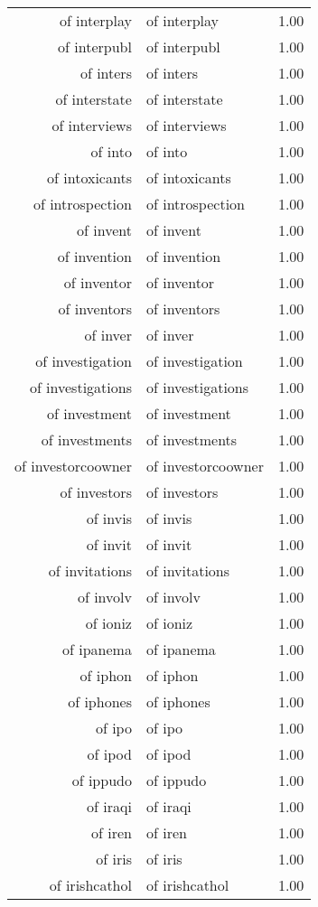 \begin{table}[ht]
\begin{tabular}{rlr}
  of interplay & of interplay & 1.00 \\ 
  of interpubl & of interpubl & 1.00 \\ 
  of inters & of inters & 1.00 \\ 
  of interstate & of interstate & 1.00 \\ 
  of interviews & of interviews & 1.00 \\ 
  of into & of into & 1.00 \\ 
  of intoxicants & of intoxicants & 1.00 \\ 
  of introspection & of introspection & 1.00 \\ 
  of invent & of invent & 1.00 \\ 
  of invention & of invention & 1.00 \\ 
  of inventor & of inventor & 1.00 \\ 
  of inventors & of inventors & 1.00 \\ 
  of inver & of inver & 1.00 \\ 
  of investigation & of investigation & 1.00 \\ 
  of investigations & of investigations & 1.00 \\ 
  of investment & of investment & 1.00 \\ 
  of investments & of investments & 1.00 \\ 
  of investorcoowner & of investorcoowner & 1.00 \\ 
  of investors & of investors & 1.00 \\ 
  of invis & of invis & 1.00 \\ 
  of invit & of invit & 1.00 \\ 
  of invitations & of invitations & 1.00 \\ 
  of involv & of involv & 1.00 \\ 
  of ioniz & of ioniz & 1.00 \\ 
  of ipanema & of ipanema & 1.00 \\ 
  of iphon & of iphon & 1.00 \\ 
  of iphones & of iphones & 1.00 \\ 
  of ipo & of ipo & 1.00 \\ 
  of ipod & of ipod & 1.00 \\ 
  of ippudo & of ippudo & 1.00 \\ 
  of iraqi & of iraqi & 1.00 \\ 
  of iren & of iren & 1.00 \\ 
  of iris & of iris & 1.00 \\ 
  of irishcathol & of irishcathol & 1.00 \\ 

\end{tabular}
\end{table}
